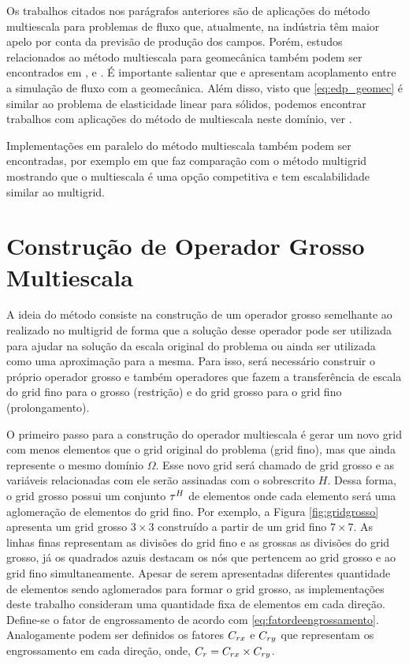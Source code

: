 Os trabalhos citados nos parágrafos anteriores são de aplicações do método multiescala para  problemas de fluxo que, atualmente, na indústria têm maior apelo por conta da previsão de produção dos campos. Porém, estudos relacionados ao método multiescala para geomecânica também podem ser encontrados em \citet{casteletto}, \citet{irina} e \citet{castelettoacoplado}. É importante salientar que \cite{casteletto} e \cite{irina} apresentam acoplamento entre a simulação de fluxo com a geomecânica. Além disso, visto que \eqref{eq:edp_geomec} é similar ao problema de elasticidade linear para sólidos, podemos encontrar trabalhos com aplicações do método de multiescala neste domínio, ver \citet{mbuck}. 

Implementações em paralelo do método multiescala também podem ser encontradas, por exemplo em \citet{msparalelo} que faz comparação com o método multigrid mostrando que o multiescala é uma opção competitiva e tem escalabilidade similar ao multigrid.

\section{Construção de Operador Grosso Multiescala}

A ideia do método consiste na construção de um operador grosso semelhante ao realizado no multigrid de forma que a solução desse operador pode ser utilizada para ajudar na solução da escala original do problema ou ainda ser utilizada como uma aproximação para a mesma. Para isso, será necessário construir o próprio operador grosso e também operadores que fazem a transferência de escala do grid fino para o grosso (restrição) e do grid grosso para o grid fino (prolongamento).


O primeiro passo para a construção do operador multiescala é gerar um novo grid com menos elementos que o grid original do problema (grid fino), mas que ainda represente o mesmo domínio $\Omega$. Esse novo grid será chamado de grid grosso e as variáveis relacionadas com ele serão assinadas com o sobrescrito $H$.
Dessa forma, o grid grosso possui um conjunto $\tau^H$ de elementos onde cada elemento será uma aglomeração de elementos do grid fino. Por exemplo, a Figura \ref{fig:gridgrosso} apresenta um grid grosso $3\times 3$ construído a partir de um grid fino $7\times 7$.  As linhas finas representam as divisões do grid fino e as grossas as divisões do grid grosso, já os  quadrados azuis destacam os nós que pertencem ao grid grosso e ao grid fino simultaneamente. Apesar de serem apresentadas diferentes quantidade de elementos sendo aglomerados para formar o grid grosso, as implementações deste trabalho consideram uma quantidade fixa de elementos em cada direção. Define-se o fator de engrossamento de acordo com \eqref{eq:fatordeengrossamento}. Analogamente podem ser definidos os fatores $C_{rx}$ e $C_{ry}$ que representam os engrossamento em cada direção, onde, $C_r = C_{rx} \times C_{ry}$.

